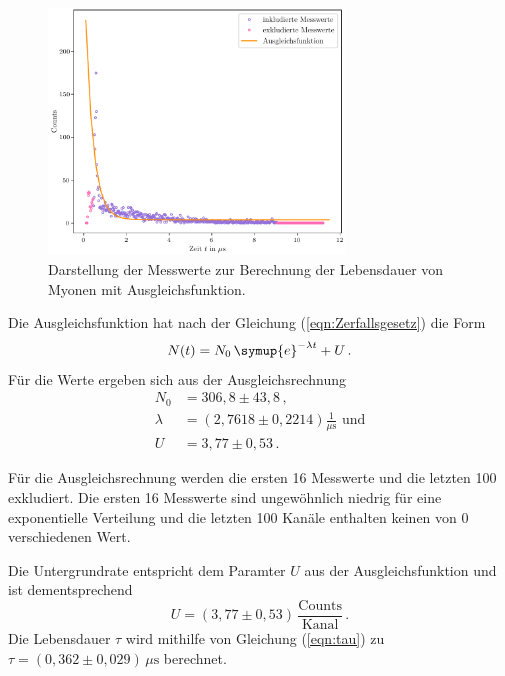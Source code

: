 \begin{figure}
  \centering
  \includegraphics[width=0.70\textwidth]{Lebensdauer_der_Myonen.pdf}
  \caption{Darstellung der Messwerte zur Berechnung der Lebensdauer von Myonen mit Ausgleichsfunktion.}
  \label{fig:Lebensdauer_Myonen}
\end{figure}

Die Ausgleichsfunktion hat nach der Gleichung (\ref{eqn:Zerfallsgesetz}) die Form 
$$ N(t) = N_0 \,\symup{e}^{-\lambda t} + U \,.$$
Für die Werte ergeben sich aus der Ausgleichsrechnung 
\begin{align*}
  N_0 &= 306,8 \pm 43,8 \, ,\\
  \lambda &= (2,7618 \pm 0,2214) \frac{1}{\unit{\mu\second}} \,\, \text{und}\\
  U &= 3,77 \pm 0,53 \, .
\end{align*}

Für die Ausgleichsrechnung werden 
die ersten 16 Messwerte und die letzten 100 exkludiert. Die ersten 16
Messwerte sind ungewöhnlich niedrig für eine exponentielle Verteilung 
und die letzten 100 Kanäle enthalten keinen von 0 verschiedenen Wert. 

Die Untergrundrate entspricht dem Paramter $U$ aus der Ausgleichsfunktion 
und ist dementsprechend $$U = (3,77 \pm 0,53) \, \frac{\text{Counts}}{\text{Kanal}}\,.$$
Die Lebensdauer $\tau$ wird mithilfe von Gleichung (\ref{eqn:tau}) zu 
$\tau = (0,362 \pm 0,029) \, \unit{\mu\second} $ berechnet.


\FloatBarrier

